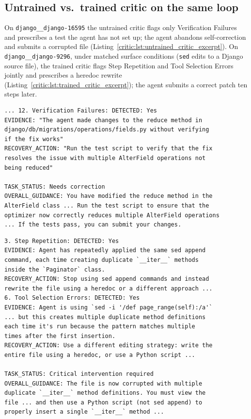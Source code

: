 \subsection{Untrained vs.\ trained critic on the same loop}
\label{critic:app:untrained_vs_trained}

On \texttt{django\_\_django-16595} the untrained critic flags only Verification Failures and prescribes a test the agent has not set up; the agent abandons self-correction and submits a corrupted file (Listing~\ref{critic:lst:untrained_critic_excerpt}). On \texttt{django\_\_django-9296}, under matched surface conditions (\texttt{sed} edits to a Django source file), the trained critic flags Step Repetition and Tool Selection Errors jointly and prescribes a heredoc rewrite (Listing~\ref{critic:lst:trained_critic_excerpt}); the agent submits a correct patch ten steps later.

\begin{lstlisting}[caption={Untrained critic at agent step 10 on \texttt{django\_\_django-16595}. Only Verification Failures is flagged, with a recovery prescribing a test the agent has not set up.}, label={critic:lst:untrained_critic_excerpt}]
... 12. Verification Failures: DETECTED: Yes
EVIDENCE: "The agent made changes to the reduce method in
django/db/migrations/operations/fields.py without verifying
if the fix works"
RECOVERY_ACTION: "Run the test script to verify that the fix
resolves the issue with multiple AlterField operations not
being reduced"

TASK_STATUS: Needs correction
OVERALL_GUIDANCE: You have modified the reduce method in the
AlterField class ... Run the test script to ensure that the
optimizer now correctly reduces multiple AlterField operations
... If the tests pass, you can submit your changes.
\end{lstlisting}

\begin{lstlisting}[caption={Trained critic at agent step 10 on \texttt{django\_\_django-9296}. Flags Step Repetition and Tool Selection Errors jointly and tells the agent to switch off \texttt{sed} append.}, label={critic:lst:trained_critic_excerpt}]
3. Step Repetition: DETECTED: Yes
EVIDENCE: Agent has repeatedly applied the same sed append
command, each time creating duplicate `__iter__` methods
inside the `Paginator` class.
RECOVERY_ACTION: Stop using sed append commands and instead
rewrite the file using a heredoc or a different approach ...
6. Tool Selection Errors: DETECTED: Yes
EVIDENCE: Agent is using `sed -i '/def page_range(self):/a'`
... but this creates multiple duplicate method definitions
each time it's run because the pattern matches multiple
times after the first insertion.
RECOVERY_ACTION: Use a different editing strategy: write the
entire file using a heredoc, or use a Python script ...

TASK_STATUS: Critical intervention required
OVERALL_GUIDANCE: The file is now corrupted with multiple
duplicate `__iter__` method definitions. You must view the
file ... and then use a Python script (not sed append) to
properly insert a single `__iter__` method ...
\end{lstlisting}


